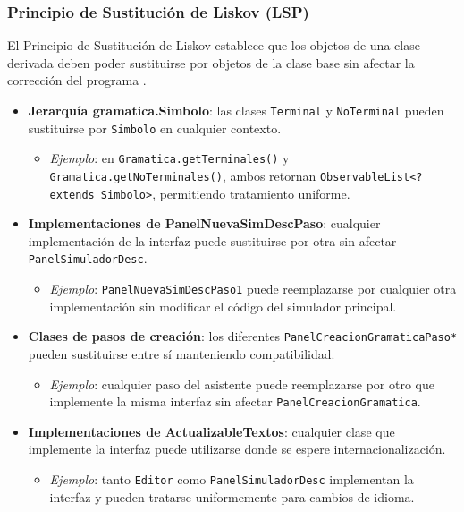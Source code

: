 \subsubsection{Principio de Sustitución de Liskov (LSP)}

El Principio de Sustitución de Liskov establece que los objetos de una clase derivada deben poder sustituirse por objetos de la clase base sin afectar la corrección del programa \cite{liсков1994program, martin2003agile}.

\begin{itemize}
    \item \textbf{Jerarquía gramatica.Simbolo}: las clases \texttt{Terminal} y \texttt{NoTerminal} pueden sustituirse por \texttt{Simbolo} en cualquier contexto.
    \begin{itemize}
        \item \textit{Ejemplo}: en \texttt{Gramatica.getTerminales()} y \texttt{Gramatica.getNoTerminales()}, ambos retornan \texttt{ObservableList<? extends Simbolo>}, permitiendo tratamiento uniforme.
    \end{itemize}

    \item \textbf{Implementaciones de PanelNuevaSimDescPaso}: cualquier implementación de la interfaz puede sustituirse por otra sin afectar \texttt{PanelSimuladorDesc}.
    \begin{itemize}
        \item \textit{Ejemplo}: \texttt{PanelNuevaSimDescPaso1} puede reemplazarse por cualquier otra implementación sin modificar el código del simulador principal.
    \end{itemize}

    \item \textbf{Clases de pasos de creación}: los diferentes \texttt{PanelCreacionGramaticaPaso*} pueden sustituirse entre sí manteniendo compatibilidad.
    \begin{itemize}
        \item \textit{Ejemplo}: cualquier paso del asistente puede reemplazarse por otro que implemente la misma interfaz sin afectar \texttt{PanelCreacionGramatica}.
    \end{itemize}

    \item \textbf{Implementaciones de ActualizableTextos}: cualquier clase que implemente la interfaz puede utilizarse donde se espere internacionalización.
    \begin{itemize}
        \item \textit{Ejemplo}: tanto \texttt{Editor} como \texttt{PanelSimuladorDesc} implementan la interfaz y pueden tratarse uniformemente para cambios de idioma.
    \end{itemize}
\end{itemize}

